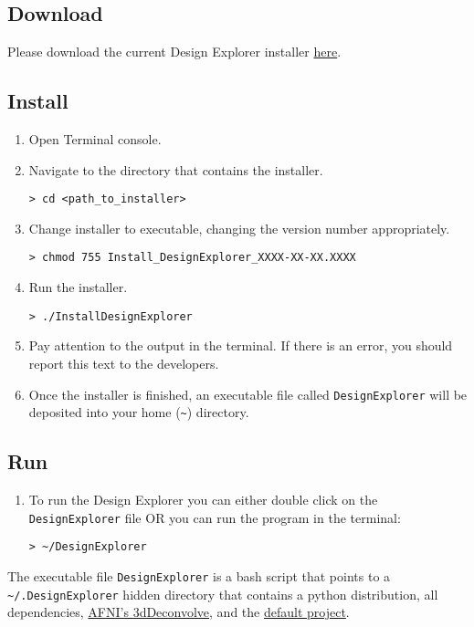 \documentclass[10pt]{article}
\begin{document}
	\subsection*{Download}
	\label{subsec:dl}
		Please download the current Design Explorer installer \href{https://www.dropbox.com/s/ncyeid1en3vjg57/DesignExplorer_installer?dl=1}{here}.

	\subsection*{Install}
	\label{subsec:install}
		\begin{enumerate}
			\item Open Terminal console.
			\item Navigate to the directory that contains the installer.
\begin{lstlisting}
> cd <path_to_installer>
\end{lstlisting}
			\item Change installer to executable, changing the version number appropriately.
\begin{lstlisting}
> chmod 755 Install_DesignExplorer_XXXX-XX-XX.XXXX
\end{lstlisting}
			\item Run the installer.
\begin{lstlisting}
> ./InstallDesignExplorer
\end{lstlisting}
			\item Pay attention to the output in the terminal.
			If there is an error, you should report this text to the developers.
			\item Once the installer is finished, an executable file called \texttt{DesignExplorer} will be deposited into your home (\texttt{\textasciitilde}) directory.
		\end{enumerate}

	\subsection*{Run}
	\label{subsec:run}
		\begin{enumerate}
		\item To run the Design Explorer you can either double click on the \texttt{DesignExplorer} file OR you can run the program in the terminal:
\begin{lstlisting}
> ~/DesignExplorer
\end{lstlisting}
		\end{enumerate}
		The executable file \texttt{DesignExplorer} is a bash script that points to a \texttt{\textasciitilde/.DesignExplorer} hidden directory that contains a python distribution, all dependencies, \href{https://afni.nimh.nih.gov/pub/dist/doc/program_help/3dDeconvolve.html}{AFNI's 3dDeconvolve}, and the \hyperref[subsec:default]{default project}.
\end{document}
